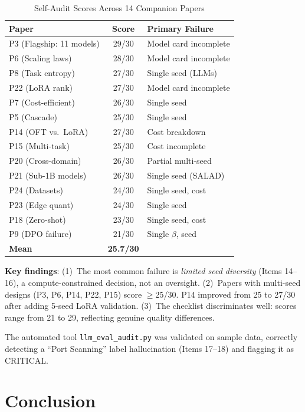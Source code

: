 \documentclass[review,3p]{elsarticle}
\begin{document}
\begin{table}[!ht]
\centering\caption{Self-Audit Scores Across 14 Companion Papers}
\label{tab:selfaudit}
\begin{tabular}{lcl}
\toprule
\textbf{Paper} & \textbf{Score} & \textbf{Primary Failure} \\
\midrule
P3 (Flagship: 11 models) & 29/30 & Model card incomplete \\
P6 (Scaling laws) & 28/30 & Model card incomplete \\
P8 (Task entropy) & 27/30 & Single seed (LLMs) \\
P22 (LoRA rank) & 27/30 & Model card incomplete \\
P7 (Cost-efficient) & 26/30 & Single seed \\
P5 (Cascade) & 25/30 & Single seed \\
P14 (OFT vs.\ LoRA) & 27/30 & Cost breakdown \\
P15 (Multi-task) & 25/30 & Cost incomplete \\
P20 (Cross-domain) & 26/30 & Partial multi-seed \\
P21 (Sub-1B models) & 26/30 & Single seed (SALAD) \\
P24 (Datasets) & 24/30 & Single seed, cost \\
P23 (Edge quant) & 24/30 & Single seed \\
P18 (Zero-shot) & 23/30 & Single seed, cost \\
P9 (DPO failure) & 21/30 & Single $\beta$, seed \\
\midrule
\textbf{Mean} & \textbf{25.7/30} & \\
\bottomrule
\end{tabular}
\end{table}

\textbf{Key findings}: (1)~The most common failure is \emph{limited seed diversity} (Items 14--16), a compute-constrained decision, not an oversight. (2)~Papers with multi-seed designs (P3, P6, P14, P22, P15) score $\geq$25/30. P14 improved from 25 to 27/30 after adding 5-seed LoRA validation. (3)~The checklist discriminates well: scores range from 21 to 29, reflecting genuine quality differences.

The automated tool \texttt{llm\_eval\_audit.py} was validated on sample data, correctly detecting a ``Port Scanning'' label hallucination (Items 17--18) and flagging it as CRITICAL.

\section{Conclusion}
\end{document}
